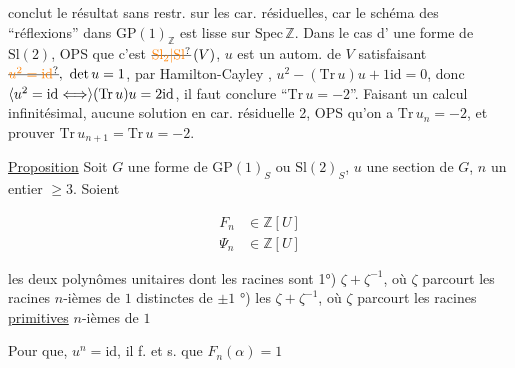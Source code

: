 conclut le résultat  sans restr. sur les
car. résiduelles, car le schéma des  ``réflexions''
dans $\mathrm{GP}(1)_{\mathbb Z}$ est lisse sur $\mathrm{Spec}\,\mathbb Z$. Dans le cas d'
une forme de $\mathrm{Sl}(2)$, OPS que c'est $\deleted{\unsure{\mathrm{Sl}_2|\mathrm{Sl}}}\,(V)$,  
$u$ est un autom. de $V$ satisfaisant $\deleted{\unsure{u^2=\mathrm{id}}},\ \det u=1$,
   par Hamilton-Cayley
, $u^2-(\mathrm{Tr}\,u)u+1\mathrm{id}=0$, donc $\inserted{u^2=\mathrm{id}\Longleftrightarrow}(\mathrm{Tr}\,u)u=2\mathrm{id}$,  
 il faut conclure ``$\mathrm{Tr}\,u=-2$''. Faisant un calcul infinitésimal,
   aucune solution en
car. résiduelle 2, OPS qu'on a $\mathrm{Tr}\,u_n=-2$, et  prouver
$\mathrm{Tr}\,u_{n+1}=\mathrm{Tr}\,u=-2$. 


\uline{Proposition} Soit $G$ une forme de $\mathrm{GP}(1)_S$ ou $\mathrm{Sl}(2)_S$, $u$ une
section de $G$,  
$n$ un entier $\geq3$.   Soient

\[
\begin{aligned}
F_n&\in\mathbb Z[U]\\ 
\Psi_n&\in\mathbb Z[U]
\end{aligned}
\]

les deux polynômes  unitaires   dont les
racines sont 1°) $\zeta+\zeta^{-1}$, où $\zeta$ parcourt les racines
$n$-ièmes  de $1$  distinctes de $\pm1$ °) les $\zeta+\zeta^{-1}$,
où $\zeta$ parcourt les racines \uline{primitives} $n$-ièmes de $1$


Pour que, $u^n=\mathrm{id}$, il f. et s. que $F_n(\alpha)=1$

